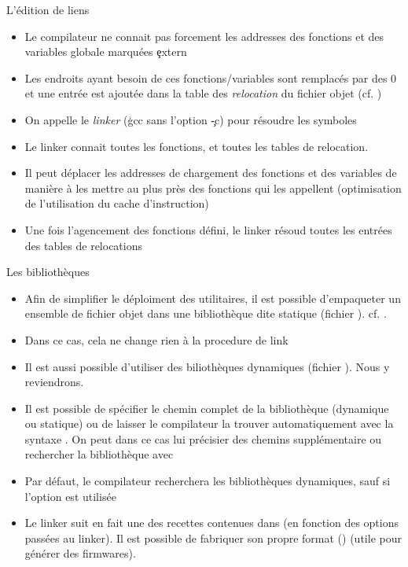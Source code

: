 \begin{frame}[fragile=singleslide]{L'édition de liens}
  \begin{itemize}
  \item  Le compilateur  ne connait  pas forcement  les  addresses des
    fonctions et des variables globale marquées \c{extern}
  \item  Les endroits  ayant  besoin de  ces fonctions/variables  sont
    remplacés par  des 0 et une  entrée est ajoutée dans  la table des
    \emph{relocation} du fichier objet (cf. )
  \item On  appelle le \emph{linker} (\c{gcc} sans  l'option \c{-c}) pour
    résoudre les symboles
  \item Le linker connait toutes les fonctions, et toutes les tables de
    relocation.
  \item Il peut déplacer les  addresses de chargement des fonctions et
    des variables de  manière à les mettre au  plus près des fonctions
    qui  les   appellent  (optimisation  de   l'utilisation  du  cache
    d'instruction)
  \item Une  fois l'agencement des fonctions défini,  le linker résoud
    toutes les entrées des tables de relocations
  \end{itemize}
\end{frame}

\begin{frame}[fragile=singleslide]{Les bibliothèques}
  \begin{itemize}
  \item  Afin de  simplifier  le déploiment  des  utilitaires, il  est
    possible  d'empaqueter  un  ensemble  de fichier  objet  dans  une
    bibliothèque dite statique (fichier ). cf. .
  \item Dans ce cas, cela ne change rien à la procedure de link
  \item Il  est aussi possible d'utiliser  des biliothèques dynamiques
    (fichier ). Nous y reviendrons.
  \item  Il  est  possible  de  spécifier  le  chemin  complet  de  la
    bibliothèque (dynamique ou statique)  ou de laisser le compilateur
    la trouver  automatiquement avec  la syntaxe .  On peut
    dans ce cas lui précisier des chemins supplémentaire ou rechercher
    la bibliothèque avec 
  \item  Par  défaut,  le  compilateur  recherchera  les  bibliothèques
    dynamiques, sauf si l'option  est utilisée
  \item  Le  linker suit  en  fait  une  des recettes  contenues  dans
      (en fonction  des  options passées  au
    linker).   Il   est  possible  de  fabriquer   son  propre  format
    () (utile pour générer des firmwares).
  \end{itemize}
\end{frame}

